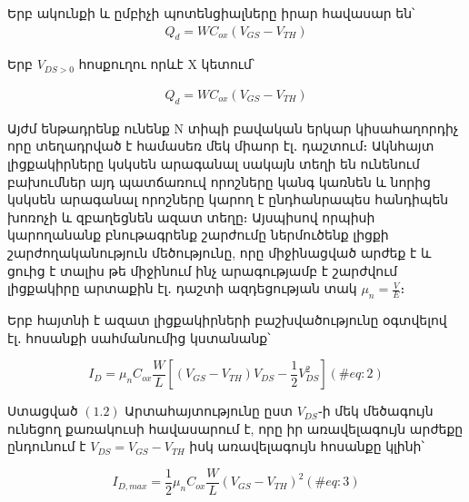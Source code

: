 \documentclass[
]{book}
\begin{document}
\begin{blackbox}

\begin{lf}

\begin{center}
Երբ ակունքի և ըմբիչի պոտենցիալները իրար հավասար են՝ \begin{align}  
  Q_d = WC_{ox}(V_{GS} - V_{TH})
\end{align}

\end{center}

\end{lf}

\begin{rig}

\begin{center}
Երբ \(V_{DS>0}\) հոսքուղու որևէ X կետում՝

\begin{align} 
  Q_d = WC_{ox}(V_{GS} - V_{TH})
\end{align}

\end{center}

\end{rig}

\end{blackbox}

Այժմ ենթադրենք ունենք N տիպի բավական երկար կիսահաղորդիչ որը տեղադրված է
համասեռ մեկ միաոր էլ․ դաշտում։ Ակնհայտ լիցքակիրները կսկսեն արագանալ
սակայն տեղի են ունենում բախումներ այդ պատճառուվ որոշները կանգ կառնեն և
նորից կսկսեն արագանալ որոշները կարող է ընդհանրապես հանդիպեն խոռոչի և
զբաղեցնեն ազատ տեղը։ Այսպիսով որպիսի կարողանանք բնութագրենք շարժումը
ներմուծենք լիցքի շարժողականություն մեծությունը, որը միջինացված արժեք է և
ցուից է տալիս թե միջինում ինչ արագությամբ է շարժվում լիցքակիրը արտաքին
էլ․ դաշտի ազդեցության տակ \(μ_n = \frac{V}{E}\)։

Երբ հայտնի է ազատ լիցքակիրների բաշխվածությունը օգտվելով էլ․ հոսանքի
սահմանումից կստանանք՝

\begin{equation} 
  I_{D} = μ_n C_{ox} \frac{W}{L}[(V_{GS} - V_{TH})V_{DS} - \frac{1}{2}V_{DS}^2]
  (\#eq:2)
\end{equation}

Ստացված \((1.2)\) Արտահայտությունը ըստ \(V_{DS}\)֊ի մեկ մեծագույն
ունեցող քառակուսի հավասարում է, որը իր առավելագույն արժեքը ընդունում է
\(V_{DS} = V_{GS} - V_{TH}\) իսկ առավելագույն հոսանքը կլինի՝

\begin{equation} 
  I_{D, max} = \frac{1}{2} μ_n C_{ox} \frac{W}{L} (V_{GS} - V_{TH})^2
  (\#eq:3)
\end{equation}
\end{document}
